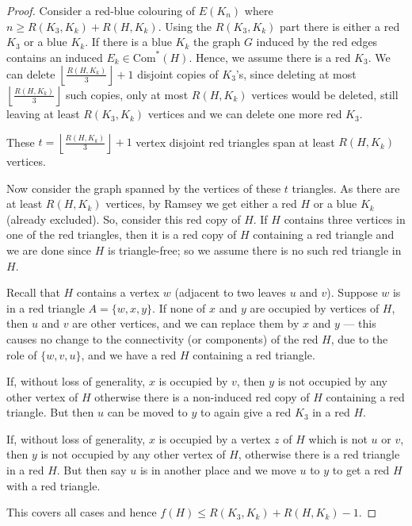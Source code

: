 \documentclass[a4paper,12pt]{article}
\begin{document}
\begin{proof}
Consider a red-blue colouring of $E(K_n)$  where $n \geq  R(K_3 , K_k)  +  R(H, K_k)$.  Using the $R(K_3,K_k)$ part there is either a red $K_3$ or a blue $K_k$. If there is a blue $K_k$ the graph $G$ induced by the red edges contains an induced  $E_k \in \text{Com}^*(H)$.  Hence,  we assume there is a red $K_3$.  We can delete $ \left \lfloor \frac{R(H,K_k)}{3} \right \rfloor  +1$ disjoint copies of $K_3$'s, since deleting at most $ \left \lfloor \frac{R(H,K_k)}{3} \right \rfloor$ such copies, only at most $R(H,K_k)$ vertices would be deleted, still leaving at least $R(K_3,K_k)$ vertices and we can delete one more red $K_3$.        

 

These $t = \left \lfloor \frac{R(H,K_k)}{3} \right \rfloor+1$ vertex disjoint red triangles  span at least  $R(H,K_k)$  vertices.


Now consider the graph spanned by the vertices of these $t$ triangles.  As there are at least $R(H,K_k)$ vertices, by Ramsey we get either a red $H$ or a blue $K_k$ (already excluded).  So,  consider this  red copy of $H$.  If $H$ contains three vertices in one of the red triangles, then it is a red copy of $H$ containing a red triangle and we are done  since $H$ is triangle-free; so we assume there is no such red triangle in $H$.

Recall that $H$ contains a vertex $w$ (adjacent to two  leaves $u$ and $v$). Suppose $w$ is in a red triangle $A = \{ w ,x ,y \}$. If none of $x$ and $y$ are occupied by vertices of  $H$, then $u$ and $v$ are other vertices, and we can replace them by $x$ and $y$ --- this causes no change to the connectivity  (or components)  of the red $H$, due to the role of $\{ w ,v ,u \}$, and we have a red $H$  containing a red triangle.

If, without loss of generality, $x$ is occupied by $v$,  then  $y$ is not occupied by any other vertex of $H$ otherwise there is a non-induced red copy of $H$ containing a red triangle. 
But then $u$ can be moved to $y$ to again give a red $K_3$ in a red  $H$.    

If, without loss of generality, $x$ is occupied by a vertex $z$ of $H$  which is not $u$ or $v$, then $y$ is not occupied by any other vertex of $H$, otherwise there is a red triangle in  a red $H$.
But then say $u$ is in another place and we move $u$ to $y$ to get a red $H$ with a red triangle.

This covers all cases and hence $f(H) \leq R(K_3,K_k) + R(H,K_k)-1$.  
\end{proof}
 
\end{document}
